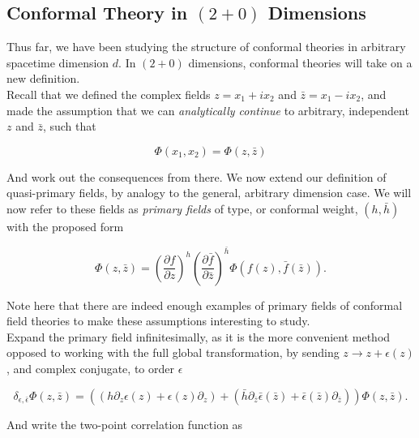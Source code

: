 \subsection*{Conformal Theory in $(2+0)$ Dimensions}

\noindent Thus far, we have been studying the structure of conformal theories in arbitrary spacetime dimension $d$. In $(2+0)$ dimensions, conformal theories will take on a new definition. \\

\noindent Recall that we defined the complex fields $z = x_1 + i x_2$ and $\bar{z} = x_1 - i x_2$, and made the assumption that we can \textit{analytically continue} to arbitrary, independent $z$ and $\bar{z}$, such that

\begin{equation}
\Phi(x_1,x_2) = \Phi(z,\bar{z})
\end{equation}

\noindent And work out the consequences from there. We now extend our definition of quasi-primary fields, by analogy to the general, arbitrary dimension case. We will now refer to these fields as \textit{primary fields} of type, or conformal weight, $(h, \bar{h})$ with the proposed form

\begin{equation}
\Phi (z, \bar{z}) = \left( \frac{\partial f}{\partial z} \right)^h \left( \frac{\partial \bar{f}}{\partial \bar{z}} \right)^{\bar{h}} \Phi (f(z), \bar{f} (\bar{z})).
\end{equation}

\noindent Note here that there are indeed enough examples of primary fields of conformal field theories to make these assumptions interesting to study. \\

\noindent Expand the primary field infinitesimally, as it is the more convenient method opposed to working with the full global transformation, by sending $z \rightarrow z + \epsilon(z)$, and complex conjugate, to order $\epsilon$

\begin{equation}
\delta_{\epsilon, \bar{\epsilon}} \Phi (z, \bar{z}) = ((h \partial_z \epsilon(z) + \epsilon (z) \partial_z ) + (\bar{h} \partial_{\bar{z}} \bar{\epsilon}(\bar{z}) + \bar{\epsilon} (\bar{z}) \partial_{\bar{z}} )) \Phi(z, \bar{z}).
\end{equation}

\noindent And write the two-point correlation function as

